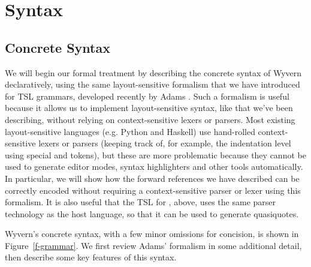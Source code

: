 \section{Syntax}
\label{s:approach}

\subsection{Concrete Syntax}

We will begin our formal treatment by describing the concrete syntax of Wyvern declaratively, using the same layout-sensitive formalism that we have introduced for TSL grammars, developed recently by Adams \cite{Adams:2013:PPI:2429069.2429129}. Such a formalism is useful because it allows us to implement  layout-sensitive syntax, like that we've been describing, without relying on context-sensitive lexers or parsers. Most existing layout-sensitive languages (e.g. Python and Haskell) use hand-rolled context-sensitive lexers or parsers (keeping track of, for example, the indentation level using special  and  tokens), but these are more problematic because they cannot be used to generate editor modes, syntax highlighters and other tools automatically. In particular, we will show how the forward references we have described can be correctly encoded without requiring a context-sensitive parser or lexer using this formalism. It is also useful that the TSL for , above, uses the same parser technology as the host language, so that it can be used to generate quasiquotes.

Wyvern's concrete syntax, with a few minor omissions for concision, is shown in Figure~\ref{f-grammar}. We first review Adams' formalism in some additional detail, then describe some key features of this syntax.

